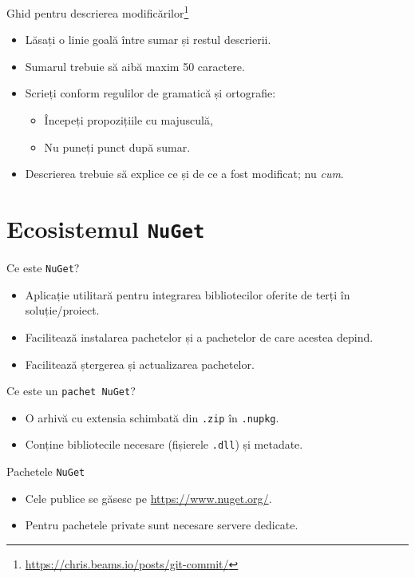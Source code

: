 \documentclass[presentation]{beamer}
\begin{document}
\begin{frame}[label={sec:orgccf73e4}]{Ghid pentru descrierea modificărilor\footnote{\url{https://chris.beams.io/posts/git-commit/}}}
\begin{itemize}
\item Lăsați o linie goală între sumar și restul descrierii.
\item Sumarul trebuie să aibă maxim 50 caractere.
\item Scrieți conform regulilor de gramatică și ortografie:
\begin{itemize}
\item Începeți propozițiile cu majusculă,
\item Nu puneți punct după sumar.
\end{itemize}
\item Descrierea trebuie să explice \alert{ce} și \alert{de ce} a fost modificat; nu \emph{cum}.
\end{itemize}
\end{frame}
\section{Ecosistemul \texttt{NuGet}}
\label{sec:org2510b9a}
\begin{frame}[label={sec:orgc708a65},fragile]{Ce este \texttt{NuGet}?}
 \begin{itemize}
\item Aplicație utilitară pentru integrarea bibliotecilor oferite de terți în soluție/proiect.
\item Facilitează instalarea pachetelor și a pachetelor de care acestea depind.
\item Facilitează ștergerea și actualizarea pachetelor.
\end{itemize}
\end{frame}
\begin{frame}[label={sec:orgaad82c3},fragile]{Ce este un \texttt{pachet NuGet}?}
 \begin{itemize}
\item O arhivă cu extensia schimbată din \texttt{.zip} în \texttt{.nupkg}.
\item Conține bibliotecile necesare (fișierele \texttt{.dll}) și metadate.
\end{itemize}
\end{frame}
\begin{frame}[label={sec:org34ac0d6},fragile]{Pachetele \texttt{NuGet}}
 \begin{itemize}
\item Cele publice se găsesc pe \url{https://www.nuget.org/}.
\item Pentru pachetele private sunt necesare servere dedicate.
\end{itemize}
\end{frame}
\end{document}
